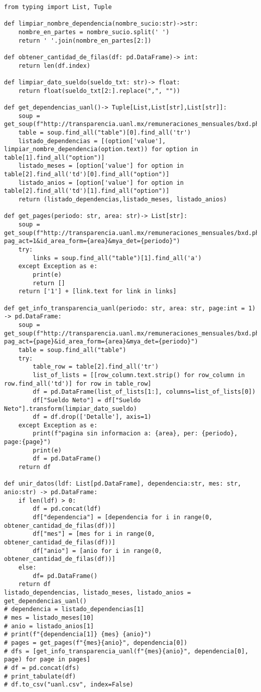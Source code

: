 \documentclass[11pt]{article}
\begin{document}
\begin{verbatim}
from typing import List, Tuple

def limpiar_nombre_dependencia(nombre_sucio:str)->str:
    nombre_en_partes = nombre_sucio.split(' ')
    return ' '.join(nombre_en_partes[2:])

def obtener_cantidad_de_filas(df: pd.DataFrame)-> int:
    return len(df.index)

def limpiar_dato_sueldo(sueldo_txt: str)-> float:
    return float(sueldo_txt[2:].replace(",", ""))

def get_dependencias_uanl()-> Tuple[List,List[str],List[str]]:
    soup = get_soup(f"http://transparencia.uanl.mx/remuneraciones_mensuales/bxd.php")
    table = soup.find_all("table")[0].find_all('tr')
    listado_dependencias = [(option['value'], limpiar_nombre_dependencia(option.text)) for option in table[1].find_all("option")]
    listado_meses = [option['value'] for option in table[2].find_all('td')[0].find_all("option")]
    listado_anios = [option['value'] for option in table[2].find_all('td')[1].find_all("option")]
    return (listado_dependencias,listado_meses, listado_anios)

def get_pages(periodo: str, area: str)-> List[str]:
    soup = get_soup(f"http://transparencia.uanl.mx/remuneraciones_mensuales/bxd.php?pag_act=1&id_area_form={area}&mya_det={periodo}")
    try:
        links = soup.find_all("table")[1].find_all('a')
    except Exception as e:
        print(e)
        return []
    return ['1'] + [link.text for link in links]

def get_info_transparencia_uanl(periodo: str, area: str, page:int = 1) -> pd.DataFrame:
    soup = get_soup(f"http://transparencia.uanl.mx/remuneraciones_mensuales/bxd.php?pag_act={page}&id_area_form={area}&mya_det={periodo}")
    table = soup.find_all("table")
    try:
        table_row = table[2].find_all('tr')
        list_of_lists = [[row_column.text.strip() for row_column in row.find_all('td')] for row in table_row]
        df = pd.DataFrame(list_of_lists[1:], columns=list_of_lists[0])
        df["Sueldo Neto"] = df["Sueldo Neto"].transform(limpiar_dato_sueldo)
        df = df.drop(['Detalle'], axis=1)
    except Exception as e:
        print(f"pagina sin informacion a: {area}, per: {periodo}, page:{page}")
        print(e)
        df = pd.DataFrame()
    return df

def unir_datos(ldf: List[pd.DataFrame], dependencia:str, mes: str, anio:str) -> pd.DataFrame:
    if len(ldf) > 0:
        df = pd.concat(ldf)
        df["dependencia"] = [dependencia for i in range(0, obtener_cantidad_de_filas(df))]
        df["mes"] = [mes for i in range(0, obtener_cantidad_de_filas(df))]
        df["anio"] = [anio for i in range(0, obtener_cantidad_de_filas(df))]
    else:
        df= pd.DataFrame()
    return df
listado_dependencias, listado_meses, listado_anios = get_dependencias_uanl()
# dependencia = listado_dependencias[1]
# mes = listado_meses[10]
# anio = listado_anios[1]
# print(f"{dependencia[1]} {mes} {anio}")
# pages = get_pages(f"{mes}{anio}", dependencia[0])
# dfs = [get_info_transparencia_uanl(f"{mes}{anio}", dependencia[0], page) for page in pages]
# df = pd.concat(dfs)
# print_tabulate(df)
# df.to_csv("uanl.csv", index=False)



\end{verbatim}
\end{document}
